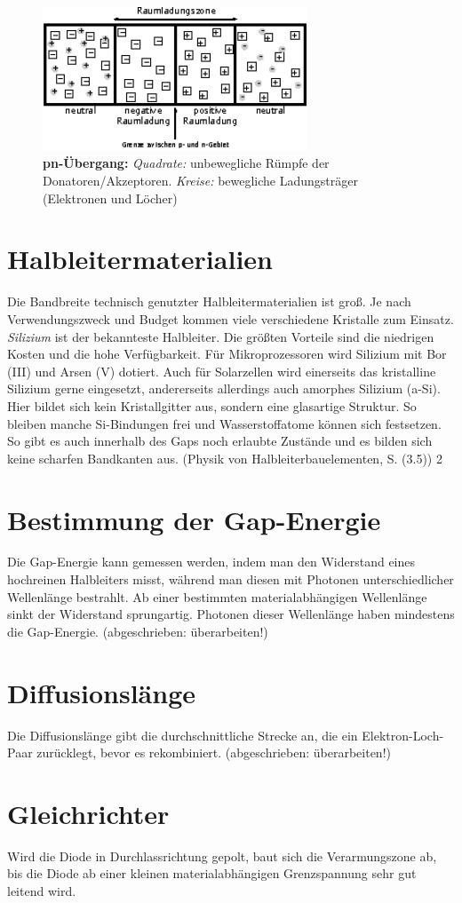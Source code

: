 \begin{figure}[htb]
	\centering
	\includegraphics[width=0.7\textwidth]{Abb/pn.eps}
	\caption{\textbf{pn-Übergang:} \emph{Quadrate:} unbewegliche Rümpfe der Donatoren/Akzeptoren. \emph{Kreise:} bewegliche Ladungsträger (Elektronen und Löcher)}
	\label{pn}
\end{figure}

\section*{Halbleitermaterialien}
Die Bandbreite technisch genutzter Halbleitermaterialien ist groß. Je nach Verwendungszweck und Budget kommen viele verschiedene Kristalle zum Einsatz.\\
\emph{Silizium} ist der bekannteste Halbleiter. Die größten Vorteile sind die niedrigen Kosten und die hohe Verfügbarkeit. Für Mikroprozessoren wird Silizium mit Bor (III) und Arsen (V) dotiert. Auch für Solarzellen wird einerseits das kristalline Silizium gerne eingesetzt, andererseits allerdings auch amorphes Silizium (a-Si). Hier bildet sich kein Kristallgitter aus, sondern eine glasartige Struktur. So bleiben manche Si-Bindungen frei und Wasserstoffatome können sich festsetzen. So gibt es auch innerhalb des Gaps noch erlaubte Zustände und es bilden sich keine scharfen Bandkanten aus. (Physik von Halbleiterbauelementen, S. (3.5))
2

\section*{Bestimmung der Gap-Energie}
Die Gap-Energie kann gemessen werden, indem man den Widerstand eines hochreinen Halbleiters misst, während man diesen mit Photonen unterschiedlicher Wellenlänge bestrahlt. Ab einer bestimmten materialabhängigen Wellenlänge sinkt der Widerstand sprungartig. Photonen dieser Wellenlänge haben mindestens die Gap-Energie.
(abgeschrieben: überarbeiten!)

\section*{Diffusionslänge}
Die Diffusionslänge gibt die durchschnittliche Strecke an, die ein Elektron-Loch-Paar zurücklegt, bevor es rekombiniert. (abgeschrieben: überarbeiten!)

\section*{Gleichrichter}
Wird die Diode in Durchlassrichtung gepolt, baut sich die Verarmungszone ab, bis die Diode ab einer kleinen materialabhängigen Grenzspannung sehr gut leitend wird.

